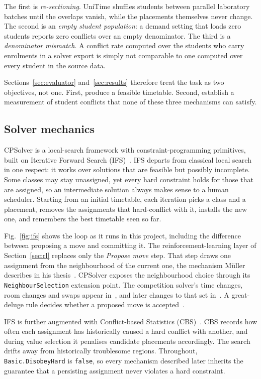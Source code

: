 \documentclass[journal]{IEEEtran}
\begin{document}
The first is \emph{re-sectioning}. UniTime shuffles students between parallel laboratory batches until the overlaps vanish, while the placements themselves never change. The second is an \emph{empty student population}: a demand setting that loads zero students reports zero conflicts over an empty denominator. The third is a \emph{denominator mismatch}. A conflict rate computed over the students who carry enrolments in a solver export is simply not comparable to one computed over every student in the source data.

Sections~\ref{sec:evaluator} and~\ref{sec:results} therefore treat the task as two objectives, not one. First, produce a feasible timetable. Second, establish a measurement of student conflicts that none of these three mechanisms can satisfy.

\subsection{Solver mechanics}
CPSolver is a local-search framework with constraint-programming primitives, built on Iterative Forward Search (IFS)~\cite{muller2004constraint}. IFS departs from classical local search in one respect: it works over solutions that are feasible but possibly incomplete. Some classes may stay unassigned, yet every hard constraint holds for those that are assigned, so an intermediate solution always makes sense to a human scheduler. Starting from an initial timetable, each iteration picks a class and a placement, removes the assignments that hard-conflict with it, installs the new one, and remembers the best timetable seen so far.

Fig.~\ref{fig:ifs} shows the loop as it runs in this project, including the difference between proposing a move and committing it. The reinforcement-learning layer of Section~\ref{sec:rl} replaces only the \emph{Propose move} step. That step draws one assignment from the neighbourhood of the current one, the mechanism M\"uller describes in his thesis~\cite{muller2005thesis}. CPSolver exposes the neighbourhood choice through its \texttt{NeighbourSelection} extension point. The competition solver's time changes, room changes and swaps appear in~\cite{muller2009itc}, and later changes to that set in~\cite{muller2016evolution}. A great-deluge rule decides whether a proposed move is accepted~\cite{dueck1993deluge}.

IFS is further augmented with Conflict-based Statistics (CBS)~\cite{muller2004constraint}. CBS records how often each assignment has historically caused a hard conflict with another, and during value selection it penalises candidate placements accordingly. The search drifts away from historically troublesome regions. Throughout, \texttt{Basic.DisobeyHard} is \texttt{false}, so every mechanism described later inherits the guarantee that a persisting assignment never violates a hard constraint.
\end{document}
